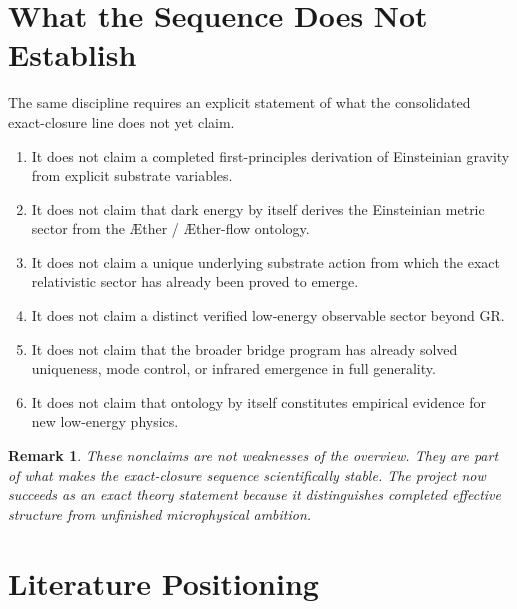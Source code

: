 \documentclass[11pt]{article}
\newcommand{\Aether}{\AE{}ther}
\newcommand{\Aflow}{\AE{}ther-flow}
\newtheorem{remark}{Remark}
\begin{document}
\section{What the Sequence Does Not Establish}

The same discipline requires an explicit statement of what the consolidated exact-closure line does not yet claim.
\begin{enumerate}
    \item It does not claim a completed first-principles derivation of Einsteinian gravity from explicit substrate variables.
    \item It does not claim that dark energy by itself derives the Einsteinian metric sector from the \Aether{} / \Aflow{} ontology.
    \item It does not claim a unique underlying substrate action from which the exact relativistic sector has already been proved to emerge.
    \item It does not claim a distinct verified low-energy observable sector beyond GR.
    \item It does not claim that the broader bridge program has already solved uniqueness, mode control, or infrared emergence in full generality.
    \item It does not claim that ontology by itself constitutes empirical evidence for new low-energy physics.
\end{enumerate}

\begin{remark}
These nonclaims are not weaknesses of the overview. They are part of what makes the exact-closure sequence scientifically stable. The project now succeeds as an exact theory statement because it distinguishes completed effective structure from unfinished microphysical ambition.
\end{remark}

\section{Literature Positioning}
\end{document}
